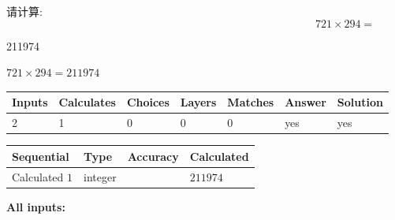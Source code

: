 \documentclass{ctexart}
\begin{document}
  
 
请计算:
\begin{equation}
721  \times    %
294 = \nonumber
\end{equation}
 
 
 
\noindent{}
 
 

211974
 
 
\noindent{}
 
 

 
 
 
\noindent{}
 
 

$ %
721 \times  %
294=   %
211974$
 
 
\noindent{}
 
 

 
   
   
   
   
\noindent\begin{tabular}{|l|l|l|l|l|l|l|}
 \hline
Inputs & Calculates & Choices & Layers & Matches & Answer & Solution \\ \hline
 2  & 
 1  & 
 0
  & 
 0  & 
 0  & 
  yes & 
  yes 
  \\ \hline
 \end{tabular}
   
   
   
   
\noindent{}
   
   
  
  
\noindent\begin{tabular}{|l|l|l|l|}
\hline
 Sequential & Type & Accuracy & Calculated \\ 
\hline
 
 
  Calculated $  1 $ & integer &  & 
  $ 211974 $ 
 \\  \hline  
 \end{tabular}
   
   
   
   
\noindent\vspace{0.1in}\hspace{-0.08in} {\textbf{\Large{All inputs: }}}
   
\end{document}
